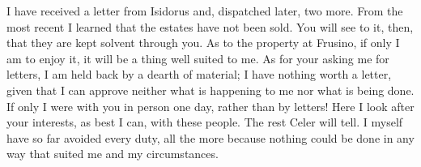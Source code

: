 

I have received a letter from Isidorus and, dispatched later, two more. From the most recent I learned that the estates have not been sold. You will see to it, then, that they are kept solvent through you. As to the property at Frusino, if only I am to enjoy it, it will be a thing well suited to me. As for your asking me for letters, I am held back by a dearth of material; I have nothing worth a letter, given that I can approve neither what is happening to me nor what is being done. If only I were with you in person one day, rather than by letters! Here I look after your interests, as best I can, with these people. The rest Celer will tell. I myself have so far avoided every duty, all the more because nothing could be done in any way that suited me and my circumstances.
